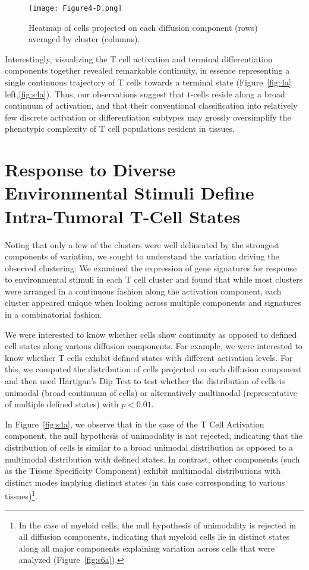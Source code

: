 \begin{figure}
\centering
\texttt{[image: Figure4-D.png]}
\caption{Heatmap of cells projected on each diffusion component (rows) averaged by cluster (columns).
}
\label{fig:4d}
\end{figure}

Interestingly, visualizing the T cell activation and terminal differentiation components together revealed remarkable continuity, in essence representing a single continuous trajectory of T cells towards a terminal state (Figure~\ref{fig:4a} left,\ref{fig:s4a}).
Thus, our observations suggest that t-cells reside along a broad continuum of activation, and that their conventional classification into relatively few discrete activation or differentiation subtypes may grossly oversimplify the phenotypic complexity of T cell populations resident in tissues.

\section{Response to Diverse Environmental Stimuli Define Intra-Tumoral T-Cell States}

Noting that only a few of the clusters were well delineated by the strongest components of variation, we sought to understand the variation driving the observed clustering.
We examined the expression of gene signatures for response to environmental stimuli in each T cell cluster and found that while most clusters were arranged in a continuous fashion along the activation component, each cluster appeared unique when looking across multiple components and signatures in a combinatorial fashion. 

We were interested to know whether cells show continuity as opposed to defined cell states along various diffusion components.
For example, we were interested to know whether T cells exhibit defined states with different activation levels.
For this, we computed the distribution of cells projected on each diffusion component and then used Hartigan's Dip Test \citep{Hartigan1985} to test whether the distribution of cells is unimodal (broad continuum of cells) or alternatively multimodal (representative of multiple defined states) with $p<0.01$.

In Figure~\ref{fig:s4a}, we observe that in the case of the T Cell Activation component, the null hypothesis of unimodality is not rejected, indicating that the distribution of cells is similar to a broad unimodal distribution as opposed to a multimodal distribution with defined states. 
In contrast, other components (such as the Tissue Specificity Component) exhibit multimodal distributions with distinct modes implying distinct states (in this case corresponding to various tissues)\footnote{In the case of myeloid cells, the null hypothesis of unimodality is rejected in all diffusion components, indicating that myeloid cells lie in distinct states along all major components explaining variation across cells that were analyzed (Figure~\ref{fig:s6a}).}.

